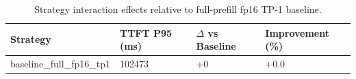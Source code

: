 \begin{table}
\caption{Strategy interaction effects relative to full-prefill fp16 TP-1 baseline.}
\label{tab:interactions}
\begin{tabular}{llll}
\toprule
Strategy & TTFT P95 (ms) & $\Delta$ vs Baseline & Improvement (\%) \\
\midrule
baseline\_full\_fp16\_tp1 & 102473 & +0 & +0.0 \\
\bottomrule
\end{tabular}
\end{table}
